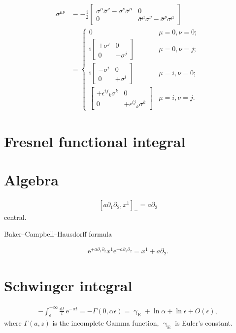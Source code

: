 \documentclass[12pt]{article}
\newcommand\mi{\mathrm{i}} %
\newcommand\me{\mathrm{e}} %
\newcommand\dif{\mathrm{d}}
\newcommand{\sbr}[1]{{\left[#1\right]}}
\newcommand{\rfun}[2]{{#1}\mathopen{}\left(#2\right)\mathclose{}}
\begin{document}
\begin{align}
\sigma^{\mu\nu} &\equiv -\frac{\mi}{2}
\begin{bmatrix}
\sigma^\mu\bar\sigma^\nu-\sigma^\nu\bar\sigma^\mu & 0 \\
0 & \bar\sigma^\mu\sigma^\nu-\bar\sigma^\nu\sigma^\mu
\end{bmatrix} \nonumber \\
&=
\begin{cases}
0 & \mu = 0, \nu = 0; \\
\mi \begin{bmatrix}+\sigma^j & 0 \\ 0 & -\sigma^j\end{bmatrix}
& \mu = 0, \nu = j; \\
\mi \begin{bmatrix}-\sigma^i & 0 \\ 0 & +\sigma^i\end{bmatrix}
& \mu = i, \nu = 0; \\
\begin{bmatrix}
+\epsilon^{ij}{}_k \sigma^k & 0
\\ 0 & +\epsilon^{ij}{}_k \sigma^k\end{bmatrix}
& \mu = i, \nu = j.
\end{cases}
\end{align}

\section{Fresnel functional integral}


\citep[ch.\ 10]{mosel2004}

\section{Algebra}
\begin{align}
\sbr{a\partial_1 \partial_2, x^1}_- = a\partial_2
\end{align}
central.

Baker--Campbell--Hausdorff formula

\begin{align}
\me^{+a\partial_1\partial_2} x^1 \me^{-a\partial_1\partial_2}
= x^1 + a \partial_2.
\end{align}

\section{Schwinger integral}
\label{sec:sch-int}

\begin{align}
-\int_{\epsilon}^{+\infty} \frac{\dif t}{t}\,\me^{-\alpha t} =
-\rfun{\Gamma}{0, \alpha \epsilon} = \upgamma_\text{E} + \ln\alpha + 
\ln\epsilon + \rfun{O}{\epsilon},
\end{align}
where $\rfun{\Gamma}{a,z}$ is the incomplete Gamma function, 
$\upgamma_\text{E}$ is Euler's constant.




\end{document}
